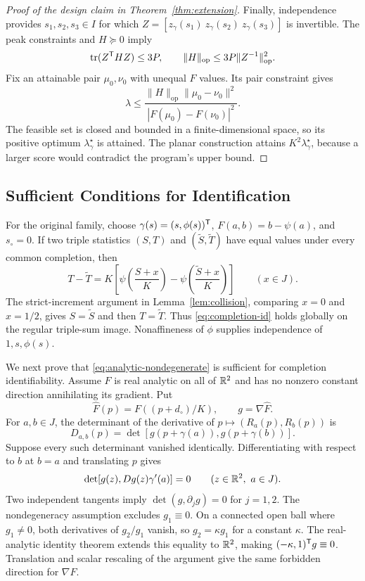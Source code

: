 \begin{proof}[Proof of the design claim in Theorem~\ref{thm:extension}]
Finally, independence provides $s_1,s_2,s_3\in I$ for which $Z=[z_\gamma(s_1)\ z_\gamma(s_2)\ z_\gamma(s_3)]$ is invertible. The peak constraints and $H\succeq0$ imply
$$
 \operatorname{tr}(Z^\mathsf T HZ)\le3P,\qquad
 \|H\|_{\mathrm{op}}\le3P\|Z^{-1}\|_{\mathrm{op}}^2.
$$
Fix an attainable pair $\mu_0,\nu_0$ with unequal $F$ values. Its pair constraint gives
$$
 \lambda\le
 \frac{\|H\|_{\mathrm{op}}\|\mu_0-\nu_0\|^2}
 {|F(\mu_0)-F(\nu_0)|^2}.
$$
The feasible set is closed and bounded in a finite-dimensional space, so its positive optimum $\lambda_\gamma^\star$ is attained. The planar construction attains $K^2\lambda_\gamma^\star$, because a larger score would contradict the program's upper bound.
\end{proof}

\subsection{Sufficient Conditions for Identification}

For the original family, choose $\gamma(s)=(s,\phi(s))^\mathsf T$, $F(a,b)=b-\psi(a)$, and $s_\circ=0$. If two triple statistics $(S,T)$ and $(\widetilde S,\widetilde T)$ have equal values under every common completion, then
$$
 T-\widetilde T
 =K\left[\psi\!\left(\frac{S+x}{K}\right)
 -\psi\!\left(\frac{\widetilde S+x}{K}\right)\right]
 \qquad(x\in J).
$$
The strict-increment argument in Lemma~\ref{lem:collision}, comparing $x=0$ and $x=1/2$, gives $S=\widetilde S$ and then $T=\widetilde T$. Thus \eqref{eq:completion-id} holds globally on the regular triple-sum image. Nonaffineness of $\phi$ supplies independence of $1,s,\phi(s)$.

We next prove that \eqref{eq:analytic-nondegenerate} is sufficient for completion identifiability. Assume $F$ is real analytic on all of $\mathbb R^2$ and has no nonzero constant direction annihilating its gradient. Put
$$
 \widehat F(p)=F((p+d_\circ)/K),\qquad g=\nabla\widehat F.
$$
For $a,b\in J$, the determinant of the derivative of $p\mapsto(R_a(p),R_b(p))$ is
$$
 D_{a,b}(p)=\det[g(p+\gamma(a)),g(p+\gamma(b))].
$$
Suppose every such determinant vanished identically. Differentiating with respect to $b$ at $b=a$ and translating $p$ gives
$$
 \det[g(z),Dg(z)\gamma'(a)]=0
 \qquad(z\in\mathbb R^2,\ a\in J).
$$
Two independent tangents imply $\det(g,\partial_jg)=0$ for $j=1,2$. The nondegeneracy assumption excludes $g_1\equiv0$. On a connected open ball where $g_1\ne0$, both derivatives of $g_2/g_1$ vanish, so $g_2=\kappa g_1$ for a constant $\kappa$. The real-analytic identity theorem extends this equality to $\mathbb R^2$, making $(-\kappa,1)^\mathsf T g\equiv0$. Translation and scalar rescaling of the argument give the same forbidden direction for $\nabla F$.

